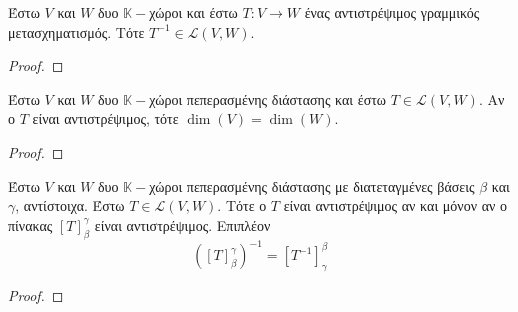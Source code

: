 \begin{thm}
  Έστω $V$ και $W$ δυο $ \mathbb{K}- $χώροι και έστω $ T \colon V \to W $ ένας 
  αντιστρέψιμος γραμμικός μετασχηματισμός. Τότε $ T^{-1} \in \mathcal{L}(V,W) $.
\end{thm}

\begin{proof}

\end{proof}

\begin{thm}
  Έστω $V$ και $W$ δυο $ \mathbb{K}- $χώροι πεπερασμένης διάστασης και έστω 
  $ T \in \mathcal{L}(V,W) $. Αν ο $T$ είναι αντιστρέψιμος, τότε 
  $ \dim(V) = \dim(W) $.
\end{thm}

\begin{proof}

\end{proof}

\begin{thm}
  Έστω $V$ και $W$ δυο $ \mathbb{K}- $χώροι πεπερασμένης διάστασης με διατεταγμένες 
  βάσεις $\beta$ και $\gamma$, αντίστοιχα. Έστω $ T \in \mathcal{L}(V,W) $. Τότε 
  ο $T$ είναι αντιστρέψιμος αν και μόνον αν ο πίνακας $ [T]_{\beta}^{\gamma } $ 
  είναι αντιστρέψιμος. Επιπλέον
  \[
    \left([T]_{\beta }^{\gamma }\right)^{-1} = [T^{-1}]_{\gamma }^{\beta} 
  \]
\end{thm}

\begin{proof}

\end{proof}


